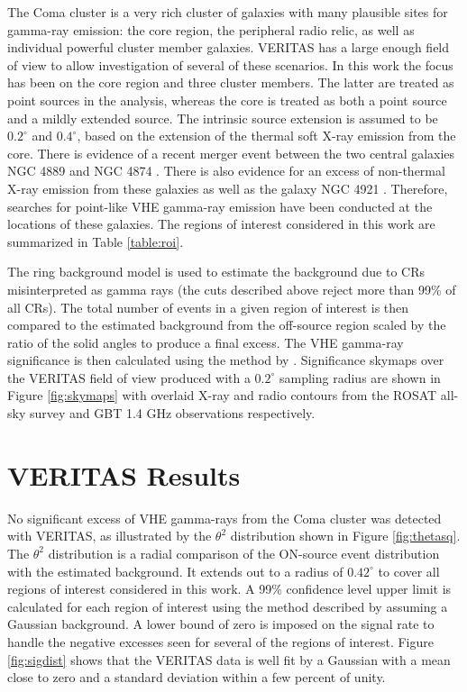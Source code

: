 \documentclass[12pt,manuscript]{aastex}
\begin{document}
The Coma cluster is a very rich cluster of galaxies with many plausible sites for gamma-ray
emission: the core region, the peripheral radio relic, as well as individual powerful cluster
member galaxies. VERITAS has a large enough field of view to allow investigation of several of
these scenarios. In this work the focus has been on the core region and three cluster members. The
latter are treated as point sources in the analysis, whereas the core is treated as both a point
source and a mildly extended source. The intrinsic source extension is assumed to be $0.2^{\circ}$
and $0.4^{\circ}$, based on the extension of the thermal soft X-ray emission from the core. There
is evidence of a recent merger event between the two central galaxies NGC 4889 and NGC 4874
\citep{article:Tribble:1993}. There is also evidence for an excess of non-thermal X-ray emission
from these galaxies as well as the galaxy NGC 4921 \citep{article:Neumann_etal:2003}. Therefore,
searches for point-like VHE gamma-ray emission have been conducted at the locations of these
galaxies. The regions of interest considered in this work are summarized in Table \ref{table:roi}.

The ring background model \citep{article:Aharonian_etal:2001} is used to estimate the background
due to CRs misinterpreted as gamma rays (the cuts described above reject more than 99\% of all
CRs). The total number of events in a given region of interest is then compared to the estimated
background from the off-source region scaled by the ratio of the solid angles to produce a final
excess. The VHE gamma-ray significance is then calculated using the method by
\citet{article:LiMa:1983}. Significance skymaps over the VERITAS field of view produced with a
$0.2^{\circ}$ sampling radius are shown in Figure \ref{fig:skymaps} with overlaid X-ray and radio
contours from the ROSAT all-sky survey \citep{article:BrielHenryBohringer:1992}  and GBT 1.4 GHz
observations \citep{article:BrownRudnick:2010} respectively.

%
%

\section{VERITAS Results}
No significant excess of VHE gamma-rays from the Coma cluster was detected with VERITAS, as
illustrated by the $\theta^{2}$ distribution shown in Figure \ref{fig:thetasq}. The $\theta^{2}$
distribution is a radial comparison of the ON-source event distribution with the estimated
background. It extends out to a radius of $0.42^{\circ}$ to cover all regions of interest
considered in this work. A 99\% confidence level upper limit is calculated for each region of
interest using the method described by \citet{article:Rolke_etal:2005} assuming a Gaussian
background. A lower bound of zero is imposed on the signal rate to handle the negative excesses
seen for several of the regions of interest. Figure \ref{fig:sigdist} shows that the VERITAS data
is well fit by a Gaussian with a mean close to zero and a standard deviation within a few percent
of unity. 
\end{document}
